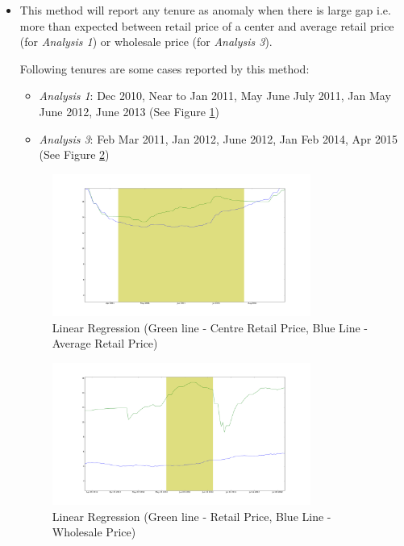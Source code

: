 		\begin{itemize}
			\item This method will report any tenure as anomaly when there is large gap i.e. more than expected between retail price of a center and average retail price (for \textit{Analysis 1}) or wholesale price (for \textit{Analysis 3}).
			
			
			
			Following tenures are some cases reported by this method:
			\begin{itemize}
				\item \textit{Analysis 1}: Dec 2010, Near to Jan 2011, May June July 2011, Jan May June 2012, June 2013 (See Figure \ref{fig:12211})
				\item \textit{Analysis 3}: Feb Mar 2011, Jan 2012, June 2012, Jan Feb 2014, Apr 2015 (See Figure \ref{fig:12231})
			\end{itemize}
			\begin{figure}[H]
		    	\centering
  		    	\includegraphics[width=0.8\textwidth]{graphs/12211.png}
		    	\caption{Linear Regression (Green line - Centre Retail Price, Blue Line - Average Retail Price)}
		    	\label{fig:12211}
			\end{figure}
			
			\begin{figure}[H]
		    	\centering
  		    	\includegraphics[width=0.8\textwidth]{graphs/12231.png}
		    	\caption{Linear Regression (Green line - Retail Price, Blue Line - Wholesale Price)}
		    	\label{fig:12231}
			\end{figure}
			

\end{itemize}
